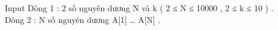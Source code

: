 Input
Dòng 1 : 2 số nguyên dương N và k ( 2 ≤ N ≤ 10000 , 2 ≤ k ≤ 10 ) .   
\\   Dòng 2 : N số nguyên dương A[1] … A[N] .